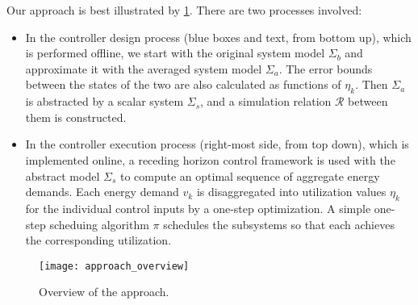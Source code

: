 Our approach is best illustrated by \cref{fig:overview}. There are two
processes involved:
\begin{itemize}
  \item In the controller design process (blue boxes and text, from bottom
  up), which is performed offline, we start with the original system model
  $\Sigma_b$ and approximate it with the averaged system model $\Sigma_a$. The
  error bounds between the states of the two are also calculated as functions
  of $\eta_k$. Then $\Sigma_a$ is abstracted by a scalar system $\Sigma_s$,
  and a simulation relation $\mathcal{R}$ between them is constructed.
  
  \item In the controller execution process (right-most side, from top down),
  which is implemented online, a receding horizon control framework is used
  with the abstract model $\Sigma_s$ to compute an optimal sequence of
  aggregate energy demands. Each energy demand $v_k$ is disaggregated into
  utilization values $\eta_k$ for the individual control inputs by a one-step
  optimization. A simple one-step scheduing algorithm $\pi$ schedules the
  subsystems so that each achieves the corresponding utilization.
\end{itemize}
\begin{figure}[h]
  \centering
  \texttt{[image: approach\_overview]}
  \caption{Overview of the approach.}
  \label{fig:overview}
\end{figure}


